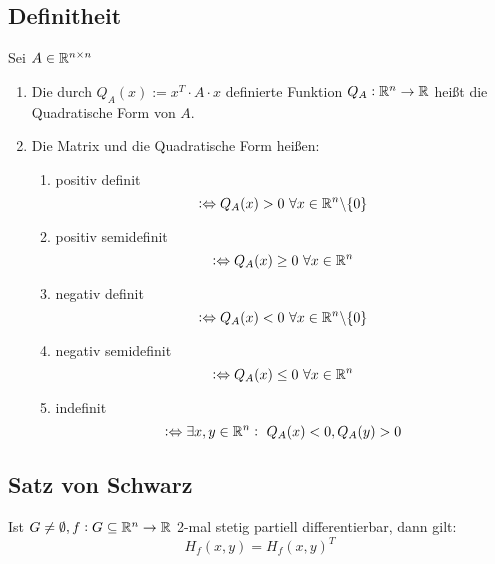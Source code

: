 \subsection{Definitheit}
Sei $A \in \mathbb{R}^{n \times n}$
\begin{enumerate}[label= (\alph*)]
    \item Die durch $Q_A(x) := x^T \cdot A \cdot x$ definierte Funktion
        $Q_A: \mathbb{R}^n \rightarrow \mathbb{R}$ heißt die Quadratische Form von $A$.
    \item Die Matrix und die Quadratische Form heißen:
        \begin{enumerate}
            \item positiv definit
                \begin{equation*}
                    :\Leftrightarrow Q_A(x) > 0\ \forall x \in \mathbb{R}^n \backslash \{ 0 \}
                \end{equation*}
            \item positiv semidefinit
                \begin{equation*}
                    :\Leftrightarrow Q_A(x) \geq 0\ \forall x \in \mathbb{R}^n
                \end{equation*}
            \item negativ definit
                \begin{equation*}
                    :\Leftrightarrow Q_A(x) < 0\ \forall x \in \mathbb{R}^n \backslash \{ 0 \}
                \end{equation*}
            \item negativ semidefinit
                \begin{equation*}
                    :\Leftrightarrow Q_A(x) \leq 0\ \forall x \in \mathbb{R}^n
                \end{equation*}
            \item indefinit
                \begin{equation*}
                    :\Leftrightarrow \exists x, y \in \mathbb{R}^n:\ Q_A(x) < 0, Q_A(y) > 0
                \end{equation*}
        \end{enumerate}
\end{enumerate}

\subsection{Satz von Schwarz}
Ist $G \neq \emptyset, f: G \subseteq \mathbb{R}^n \rightarrow \mathbb{R}$ 2-mal stetig partiell
differentierbar, dann gilt:
\begin{equation*}
    H_f(x, y) = {H_f(x,y)}^T
\end{equation*}

